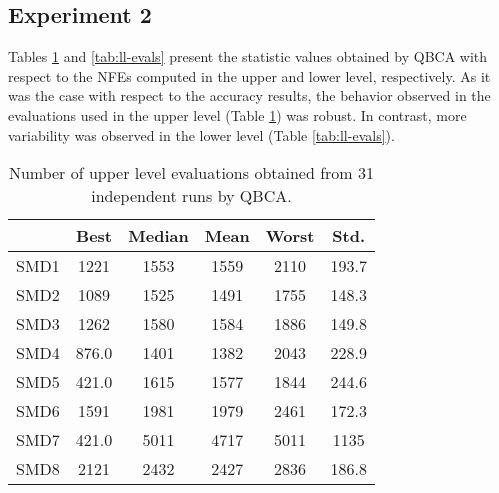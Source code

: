 \documentclass[conference]{IEEEtran}
\theoremstyle{definition}
\begin{document}
\subsection{Experiment 2}
Tables \ref{tab:ul-evals} and \ref{tab:ll-evals} present the statistic values
obtained by QBCA with respect to the NFEs computed in the upper and lower level,
respectively. As it was the case with respect to the accuracy results, the behavior
observed in the evaluations used in the upper level (Table \ref{tab:ul-evals})
was robust. In contrast, more variability was observed in the lower level
(Table \ref{tab:ll-evals}). 

\begin{table}[!ht]
    \caption{Number of upper level evaluations obtained from 31 independent runs by QBCA.}
    \label{tab:ul-evals}
    \centering
    \begin{tabular}{cccccc}
        \hline
        & Best &  Median &  Mean &  Worst &  Std. \\ \hline
        SMD1 & 1221 & 1553 & 1559 & 2110 & 193.7 \\ \hline 
        SMD2 & 1089 & 1525 & 1491 & 1755 & 148.3 \\ \hline 
        SMD3 & 1262 & 1580 & 1584 & 1886 & 149.8 \\ \hline 
        SMD4 & 876.0 & 1401 & 1382 & 2043 & 228.9 \\ \hline 
        SMD5 & 421.0 & 1615 & 1577 & 1844 & 244.6 \\ \hline 
        SMD6 & 1591 & 1981 & 1979 & 2461 & 172.3 \\ \hline 
        SMD7 & 421.0 & 5011 & 4717 & 5011 & 1135 \\ \hline 
        SMD8 & 2121 & 2432 & 2427 & 2836 & 186.8 \\ \hline 
    \end{tabular}
\end{table}
\end{document}
